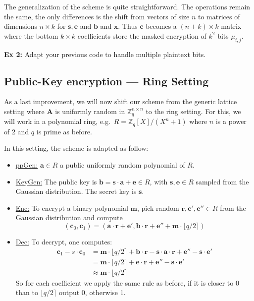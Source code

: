 \documentclass[10pt,a4paper,nobib]{tufte-handout}
\begin{document}
The generalization of the scheme is quite straightforward. The operations remain the same, the only differences is the shift from vectors of size $n$ to matrices of dimensions $n \times k$ for $\mathbf{s}, \mathbf{e}$ and $\mathbf{b}$ and $\mathbf{x}$. Thus $\mathbf{c}$ becomes a $(n+k) \times k$ matrix where the bottom $k\times k$ coefficients store the masked encryption of $k^2$ bits $\mu_{i,j}$.

\textbf{Ex 2:} Adapt your previous code to handle multiple plaintext bits.

\subsection{Public-Key encryption --- Ring Setting}

As a last improvement, we will now shift our scheme from the generic lattice setting where $\mathbf{A}$ is uniformly random in $\mathbb{Z}^{n\times n}_q$ to the ring setting. For this, we will work in a polynomial ring, e.g.~$R = \mathbb{Z}_q[X]/(X^n+1)$ where $n$ is a power of 2 and $q$ is prime as before.

In this setting, the scheme is adapted as follow:
\begin{itemize}
  \item \underline{ppGen:} $\mathbf{a} \in R$ a public uniformly random polynomial of $R$.
  \item \underline{KeyGen:} The public key is $\mathbf{b} = \mathbf{s} \cdot \mathbf{a} + \mathbf{e} \in R$, with $\mathbf{s}, \mathbf{e} \in R$ sampled from the Gaussian distribution. The secret key is $\mathbf{s}$.
  \item \underline{Enc:} To encrypt a binary polynomial $\mathbf{m}$, pick random $\mathbf{r}, \mathbf{e'}, \mathbf{e''} \in R$ from the Gaussian distribution and compute
$$ (\mathbf{c}_0, \mathbf{c}_1) = (\mathbf{a}\cdot\mathbf{r} + \mathbf{e'}, \mathbf{b}\cdot \mathbf{r} + \mathbf{e''} + \mathbf{m} \cdot \lfloor q/2 \rceil) $$
  \item \underline{Dec:}  To decrypt, one computes: 
\begin{align*}
   \mathbf{c}_1 - s \cdot \mathbf{c}_0 &= \mathbf{m} \cdot \lfloor q/2 \rceil + \mathbf{b}\cdot \mathbf{r} - \mathbf{s}\cdot\mathbf{a}\cdot\mathbf{r} + \mathbf{e''} - \mathbf{s}\cdot\mathbf{e'}\\
                                       &= \mathbf{m} \cdot \lfloor q/2 \rceil + \mathbf{e}\cdot \mathbf{r} + \mathbf{e''} - \mathbf{s}\cdot\mathbf{e'} \\
                                       &\approx  \mathbf{m} \cdot \lfloor q/2 \rceil
\end{align*}
So for each coefficient we apply the same rule as before, if it is closer to 0 than to $\lfloor q/2 \rceil$ output 0, otherwise 1. 
\end{itemize}
\end{document}
